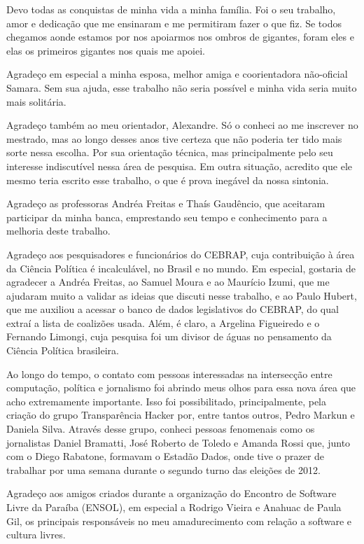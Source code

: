 Devo todas as conquistas de minha vida a minha família. Foi o seu
trabalho, amor e dedicação que me ensinaram e me permitiram fazer o que fiz. Se
todos chegamos aonde estamos por nos apoiarmos nos ombros de gigantes, foram
eles e elas os primeiros gigantes nos quais me apoiei.

Agradeço em especial a minha esposa, melhor amiga e coorientadora não-oficial
Samara. Sem sua ajuda, esse trabalho não seria possível e minha vida seria
muito mais solitária.

Agradeço também ao meu orientador, Alexandre. Só o conheci ao me inscrever no
mestrado, mas ao longo desses anos tive certeza que não poderia ter tido mais
sorte nessa escolha. Por sua orientação técnica, mas principalmente pelo seu
interesse indiscutível nessa área de pesquisa. Em outra situação, acredito que
ele mesmo teria escrito esse trabalho, o que é prova inegável da nossa
sintonia.

Agradeço as professoras Andréa Freitas e Thaís Gaudêncio, que aceitaram
participar da minha banca, emprestando seu tempo e conhecimento para a melhoria
deste trabalho.

Agradeço aos pesquisadores e funcionários do \gls{CEBRAP}, cuja contribuição à
área da Ciência Política é incalculável, no Brasil e no mundo. Em especial,
gostaria de agradecer a Andréa Freitas, ao Samuel Moura e ao Maurício Izumi, que 
me ajudaram muito a validar as ideias que discuti nesse trabalho, e ao Paulo
Hubert, que me auxiliou a acessar o banco de dados legislativos do
\gls{CEBRAP}, do qual extraí a lista de coalizões usada. Além, é claro, a
Argelina Figueiredo e o Fernando Limongi, cuja pesquisa foi um divisor de águas
no pensamento da Ciência Política brasileira.

Ao longo do tempo, o contato com pessoas interessadas na intersecção entre
computação, política e jornalismo foi abrindo meus olhos para essa nova área
que acho extremamente importante. Isso foi possibilitado, principalmente,
pela criação do grupo Transparência Hacker por, entre tantos outros, Pedro
Markun e Daniela Silva. Através desse grupo, conheci pessoas fenomenais como os
jornalistas Daniel Bramatti, José Roberto de Toledo e Amanda Rossi que, junto
com o Diego Rabatone, formavam o Estadão Dados, onde tive o prazer de trabalhar
por uma semana durante o segundo turno das eleições de 2012.

Agradeço aos amigos criados durante a organização do Encontro de Software Livre
da Paraíba (ENSOL), em especial a Rodrigo Vieira e Anahuac de Paula Gil, os
principais responsáveis no meu amadurecimento com relação a software e cultura
livres.

